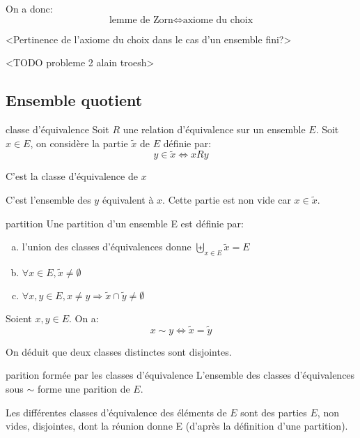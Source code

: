 \begin{remark}{}{}
    On a donc:
    \[ \text{lemme de Zorn} \Longleftrightarrow \text{axiome du choix} \]
\end{remark}

<Pertinence de l'axiome du choix dans le cas d'un ensemble fini?>

<TODO probleme 2 alain troesh>

\subsection{Ensemble quotient}

\begin{definition}{classe d'équivalence}{}
    Soit $R$ une relation d'équivalence sur un ensemble $E$.
    Soit $x \in E$, on considère la partie $\tilde{x}$ de $E$ définie par:
    \[ y \in \tilde{x} \Leftrightarrow x R y \]

    \noindent
    C'est la classe d'équivalence de $x$
\end{definition}

C'est l'ensemble des $y$ équivalent à $x$. Cette partie est non vide car $x \in \tilde{x}$.

\begin{definition}{partition}{}
    Une partition d'un ensemble E est définie par:
    \begin{enumerate}[(a)]
        \item l'union des classes d'équivalences donne $\displaystyle \biguplus_{x \in E} \tilde{x} = E$
        \item $\forall x \in E, \tilde{x} \neq \emptyset$
        \item $\forall x, y \in E, x \neq y \Rightarrow \tilde{x} \cap \tilde{y} \neq \emptyset$
    \end{enumerate}
\end{definition}

\begin{lemma}{}{}
    Soient $x, y \in E$. On a:
    \[ x \sim y \Longleftrightarrow \tilde{x} = \tilde{y} \]
\end{lemma}

On déduit que deux classes distinctes sont disjointes.

\begin{theorem}{parition formée par les classes d'équivalence}{}
    L'ensemble des classes d'équivalences sous $\sim$ forme une parition de $E$.
\end{theorem}

Les différentes classes d'équivalence des éléments de $E$ sont des parties $E$, non vides, disjointes, dont la réunion donne E (d'après la définition d'une partition).

